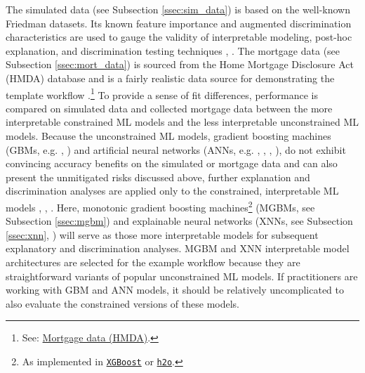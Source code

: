 \documentclass[information,article,submit,moreauthors,pdftex]{definitions/mdpi}
\begin{document}
The simulated data (see Subsection \ref{ssec:sim_data}) is based on the well-known Friedman datasets. Its known feature importance and augmented discrimination characteristics are used to gauge the validity of interpretable modeling, post-hoc explanation, and discrimination testing techniques \cite{friedman1979tree}, \cite{friedman1991multivariate}. The mortgage data (see Subsection \ref{ssec:mort_data}) is sourced from the Home Mortgage Disclosure Act (HMDA) database and is a fairly realistic data source for demonstrating the template workflow \cite{hmda}.\footnote{See: \href{https://www.consumerfinance.gov/data-research/hmda/}{Mortgage data (HMDA)}.} To provide a sense of fit differences, performance is compared on simulated data and collected mortgage data between the more interpretable constrained ML models and the less interpretable unconstrained ML models. Because the unconstrained ML models, gradient boosting machines (GBMs, e.g. \cite{friedman2001greedy}, \cite{esl}) and artificial neural networks (ANNs, e.g. \cite{recht2011hogwild}, \cite{hinton2012improving}, \cite{sutskever2013importance}, \cite{zeiler2012adadelta}), do not exhibit convincing accuracy benefits on the simulated or mortgage data and can also present the unmitigated risks discussed above, further explanation and discrimination analyses are applied only to the constrained, interpretable ML models \cite{please_stop}, \cite{fair_washing}, \cite{scaffolding}. Here, monotonic gradient boosting machines\footnote{As implemented in \href{https://xgboost.readthedocs.io/en/latest/tutorials/monotonic.html}{\texttt{XGBoost}} or \href{https://github.com/h2oai/h2o-3/blob/master/h2o-py/demos/H2O_tutorial_gbm_monotonicity.ipynb}{\texttt{h2o}}.} (MGBMs, see Subsection \ref{ssec:mgbm}) and explainable neural networks (XNNs, see Subsection \ref{ssec:xnn}, \cite{wf_xnn} \cite{yang2019enhancing}) will serve as those more interpretable models for subsequent explanatory and discrimination analyses. MGBM and XNN interpretable model architectures are selected for the example workflow because they are straightforward variants of popular unconstrained ML models. If practitioners are working with GBM and ANN models, it should be relatively uncomplicated to also evaluate the constrained versions of these models. 
\end{document}
